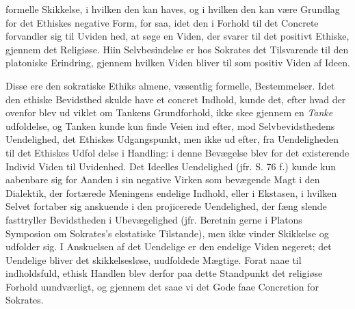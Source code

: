 \documentclass[12pt,a4paper]{book}
\begin{document}
formelle Skikkelse, i hvilken den kan haves, og i hvilken den
kan være Grundlag for det Ethiskes negative Form, for saa,
idet den i Forhold til det Concrete forvandler sig til Uviden\-%
hed, at søge en Viden, der svarer til det positivt Ethiske,
gjennem det Religiøse. Hiin Selvbesindelse er hos Sokrates
det Tilsvarende til den platoniske Erindring, gjennem hvilken
Viden bliver til som positiv Viden af Ideen.

Disse ere den sokratiske Ethiks almene, væsentlig formelle,
Bestemmelser. Idet den ethiske Bevidsthed skulde have et
concret Indhold, kunde det, efter hvad der ovenfor blev ud\-%
viklet om Tankens Grundforhold, ikke skee gjennem en \emph{Tanke}\-%
udfoldelse, og Tanken kunde kun finde Veien ind efter, mod
Selvbevidsthedens Uendelighed, det Ethiskes Udgangspunkt,
men ikke ud efter, fra Uendeligheden til det Ethiskes Udfol\-%
delse i Handling: i denne Bevægelse blev for det existerende
Individ Viden til Uvidenhed. Det Ideelles Uendelighed (jfr.
S. 76 f.) kunde kun aabenbare sig for Aanden i sin negative
Virken som bevægende Magt i den Dialektik, der fortærede
Meningens endelige Indhold, eller i Ekstasen, i hvilken Selvet
fortaber sig anskuende i den projicerede Uendelighed, der fæng\-%
slende fasttryller Bevidstheden i Ubevægelighed (jfr. Beretnin\-%
gerne i Platons Symposion om Sokrates's ekstatiske Tilstande),
men ikke vinder Skikkelse og udfolder sig. I Anskuelsen af
det Uendelige er den endelige Viden negeret; det Uendelige
bliver det skikkelsesløse, uudfoldede Mægtige. Forat naae til
indholdsfuld, ethisk Handlen blev derfor paa dette Standpunkt
det religiøse Forhold uundværligt, og gjennem det saae vi det
Gode faae Concretion for Sokrates.
\end{document}

